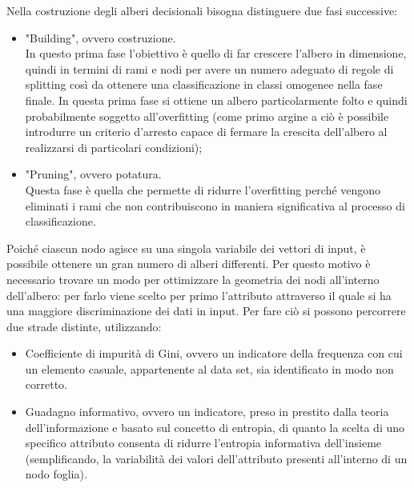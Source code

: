 Nella costruzione degli alberi decisionali bisogna distinguere due fasi successive:
\begin{itemize}
	\item "Building", ovvero costruzione.\\
	In questo prima fase l'obiettivo è quello di far crescere l'albero in dimensione, quindi in termini di rami e nodi per avere un numero adeguato di regole di splitting così da ottenere una classificazione in classi omogenee nella fase finale. In questa prima fase si ottiene un albero particolarmente folto e quindi probabilmente soggetto all'overfitting (come primo argine a ciò è possibile introdurre un criterio d'arresto capace di fermare la crescita dell'albero al realizzarsi di particolari condizioni);
	\item "Pruning", ovvero potatura.\\
	Questa fase è quella che permette di ridurre l'overfitting perché vengono eliminati i rami che non contribuiscono in maniera significativa al processo di classificazione.
	
\end{itemize} 

Poiché ciascun nodo agisce su una singola variabile dei vettori di input, è possibile ottenere un gran numero di alberi differenti. Per questo motivo è necessario trovare un modo per ottimizzare la geometria dei nodi all'interno dell'albero: per farlo viene scelto per primo l'attributo attraverso il quale si ha una maggiore discriminazione dei dati in input. Per fare ciò si possono percorrere due strade distinte, utilizzando:
\begin{itemize}
	\item Coefficiente di impurità di Gini, ovvero un indicatore della frequenza con cui un elemento casuale, appartenente al data set, sia identificato in modo non corretto.
	\item Guadagno informativo, ovvero un indicatore, preso in prestito dalla teoria dell'informazione e basato sul concetto di entropia, di quanto la scelta di uno specifico attributo consenta di ridurre l’entropia informativa dell'insieme (semplificando, la variabilità dei valori dell'attributo presenti all'interno di un nodo foglia). 
\end{itemize}  

